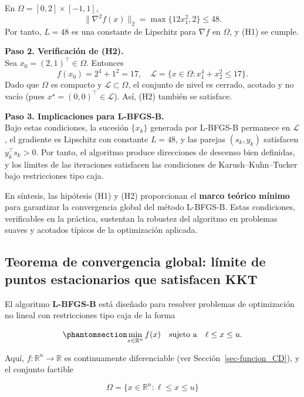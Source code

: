 \documentclass[
  spanish,
  us-letterpaper,
]{scrreprt}
\numberwithin{equation}{section}
\begin{document}
En \(\Omega = [0,2] \times [-1,1]\), \[
\|\nabla^2 f(x)\|_2 = \max\{12x_1^2, 2\} \le 48.
\] Por tanto, \(L = 48\) es una constante de Lipschitz para \(\nabla f\)
en \(\Omega\), y (H1) se cumple.

\textbf{Paso 2. Verificación de (H2).}\\
Sea \(x_0 = (2,1)^\top \in \Omega\). Entonces \[
f(x_0) = 2^4 + 1^2 = 17, \quad
\mathcal{L} = \{ x \in \Omega : x_1^4 + x_2^2 \le 17 \}.
\] Dado que \(\Omega\) es compacto y \(\mathcal{L} \subset \Omega\), el
conjunto de nivel es cerrado, acotado y no vacío (pues
\(x^\star = (0,0)^\top \in \mathcal{L}\)). Así, (H2) también se
satisface.

\textbf{Paso 3. Implicaciones para L-BFGS-B.}\\
Bajo estas condiciones, la sucesión \(\{x_k\}\) generada por L-BFGS-B
permanece en \(\mathcal{L}\), el gradiente es Lipschitz con constante
\(L = 48\), y las parejas \((s_k, y_k)\) satisfacen
\(y_k^\top s_k > 0\). Por tanto, el algoritmo produce direcciones de
descenso bien definidas, y los límites de las iteraciones satisfacen las
condiciones de Karush--Kuhn--Tucker bajo restricciones tipo caja.

En síntesis, las hipótesis (H1) y (H2) proporcionan el \textbf{marco
teórico mínimo} para garantizar la convergencia global del método
L-BFGS-B. Estas condiciones, verificables en la práctica, sustentan la
robustez del algoritmo en problemas suaves y acotados típicos de la
optimización aplicada.

\subsection{Teorema de convergencia global: límite de puntos
estacionarios que satisfacen KKT}\label{sec-convregencia_global}

El algoritmo \textbf{L-BFGS-B} está diseñado para resolver problemas de
optimización no lineal con restricciones tipo caja de la forma

\begin{equation}\phantomsection\label{eq-teo_con}{
\min_{x \in \mathbb{R}^n} f(x)
\quad \text{sujeto a} \quad \ell \le x \le u. 
}\end{equation}

Aquí, \(f : \mathbb{R}^n \to \mathbb{R}\) es continuamente diferenciable
(ver Sección~\ref{sec-funcion_CD}), y el conjunto factible

\[
\Omega = \{x \in \mathbb{R}^n : \ell \le x \le u\}
\]
\end{document}
